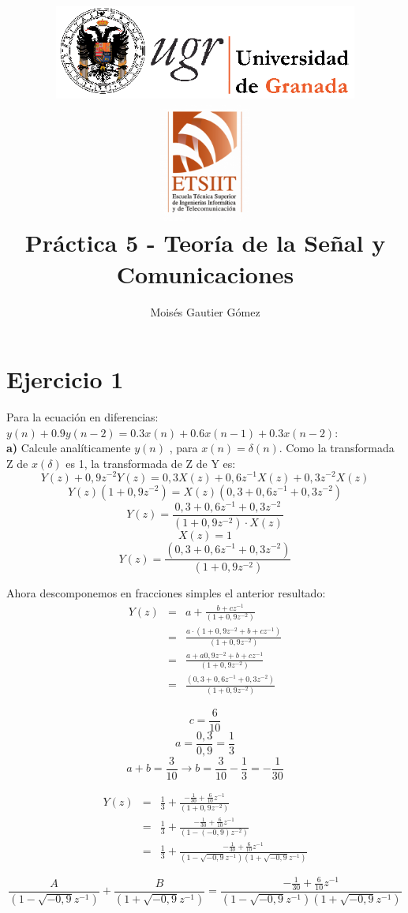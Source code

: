 \documentclass[a4paper,12pt]{article}
\author{Moisés Gautier Gómez}
\title{\includegraphics[width=10cm]{logo_ugr.png} \\ \includegraphics[width=3cm]{fetch.png}\\ Práctica 5 - Teoría de la Señal y Comunicaciones 
}
\date{ }
\begin{document}
\maketitle
\tableofcontents
\clearpage
%

\section{Ejercicio 1}
Para la ecuación en diferencias: $y(n)+0.9y(n-2) = 0.3x(n) + 0.6x(n-1) + 0.3x(n-2) $:\\

\textbf{a)} Calcule analíticamente $y(n)$ , para $x(n) = \delta (n)$.
Como la transformada Z de $x(\delta)$ es 1, la transformada de Z de Y es:
$$ Y(z) + 0,9 z^{-2} Y(z) = 0,3 X(z) + 0,6 z^{-1} X(z) + 0,3 z^{-2} X(z)$$
$$ Y(z)(1 + 0,9 z^{-2}) = X(z)(0,3 + 0,6 z^{-1} + 0,3 z^{-2})$$
$$ Y(z) = \frac{0,3 + 0,6 z^{-1} + 0,3 z^{-2}}{(1 + 0,9 z^{-2}) \cdot X(z)}$$
$$ X(z) = 1 $$
$$ Y(z) = \frac{(0,3 + 0,6 z^{-1} + 0,3 z^{-2})}{(1 + 0,9 z^{-2})}$$

Ahora descomponemos en fracciones simples el anterior resultado:
\begin{eqnarray*}
Y(z) & = & a + \frac{b + cz^{-1}}{(1 + 0,9z^{-2})} \\ & = & \frac{a \cdot (1 + 0,9z^{-2} + b + cz^{-1})}{(1 + 0,9z^{-2})} \\ & = & \frac{a + a 0,9 z^{-2} + b + cz^{-1}}{(1 + 0,9z^{-2})} \\ & = & \frac{(0,3 + 0,6z^{-1} + 0,3z^{-2})}{(1 + 0,9 z^{-2})}
\end{eqnarray*}

$$c = \frac{6}{10} $$
$$a = \frac{0,3}{0,9} = \frac{1}{3} $$
$$a + b = \frac{3}{10} \rightarrow b = \frac{3}{10} - \frac{1}{3} = - \frac{1}{30} $$

\begin{eqnarray*}
Y(z) & = & \frac{1}{3} + \frac{- \frac{1}{30} + \frac{6}{10}z^{-1}}{(1 + 0,9 z^{-2})} \\ & = & \frac{1}{3} + \frac{- \frac{1}{30} + \frac{6}{10}z^{-1}}{(1 - (-0,9) z^{-2})} \\ & = & \frac{1}{3} + \frac{- \frac{1}{30} + \frac{6}{10}z^{-1}}{(1 - \sqrt{-0,9} z^{-1})(1 + \sqrt{-0,9} z^{-1})}
\end{eqnarray*}

$$ \frac{A}{(1 - \sqrt{-0,9} z^{-1})} + \frac{B}{(1 + \sqrt{-0,9} z^{-1})} = \frac{- \frac{1}{30} + \frac{6}{10}z^{-1}}{(1 - \sqrt{-0,9} z^{-1})(1 + \sqrt{-0,9} z^{-1})} $$
\end{document}
